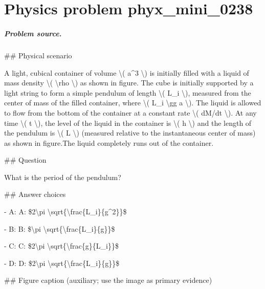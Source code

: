 
\chapter{Physics problem phyx\_mini\_0238}
\label{ch:PhyXMiniProblems_problem_phyx_mini_0238}

\paragraph{Problem source.}
\#\# Physical scenario

A light, cubical container of volume \textbackslash{}( a\textasciicircum{}3 \textbackslash{}) is initially filled with a liquid of mass density \textbackslash{}( \textbackslash{}rho \textbackslash{}) as shown in figure. The cube is initially supported by a light string to form a simple pendulum of length \textbackslash{}( L\_i \textbackslash{}), measured from the center of mass of the filled container, where \textbackslash{}( L\_i \textbackslash{}gg a \textbackslash{}). The liquid is allowed to flow from the bottom of the container at a constant rate \textbackslash{}( dM/dt \textbackslash{}). At any time \textbackslash{}( t \textbackslash{}), the level of the liquid in the container is \textbackslash{}( h \textbackslash{}) and the length of the pendulum is \textbackslash{}( L \textbackslash{}) (measured relative to the instantaneous center of mass) as shown in figure.The liquid completely runs out of the container.

\#\# Question

What is the period of the pendulum?

\#\# Answer choices

- A: A: \$2\textbackslash{}pi \textbackslash{}sqrt\{\textbackslash{}frac\{L\_i\}\{g\textasciicircum{}2\}\}\$

- B: B: \$\textbackslash{}pi \textbackslash{}sqrt\{\textbackslash{}frac\{L\_i\}\{g\}\}\$

- C: C: \$2\textbackslash{}pi \textbackslash{}sqrt\{\textbackslash{}frac\{g\}\{L\_i\}\}\$

- D: D: \$2\textbackslash{}pi \textbackslash{}sqrt\{\textbackslash{}frac\{L\_i\}\{g\}\}\$

\#\# Figure caption (auxiliary; use the image as primary evidence)

